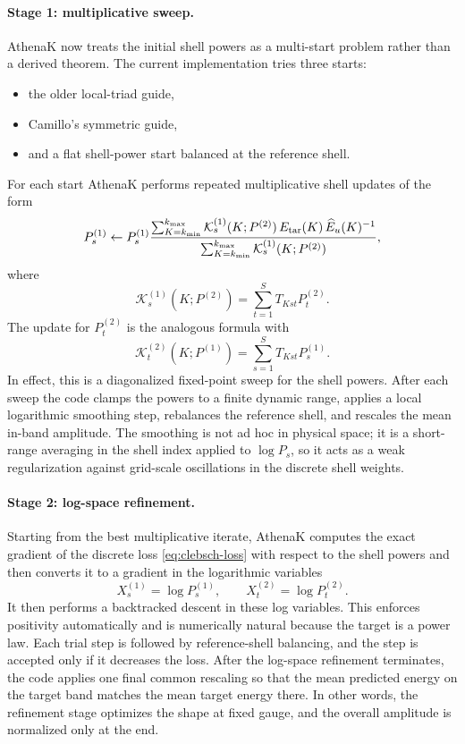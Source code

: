 \documentclass[11pt]{article}
\begin{document}
\paragraph{Stage 1: multiplicative sweep.}
AthenaK now treats the initial shell powers as a multi-start problem rather than a derived theorem. The current implementation tries three starts:
\begin{itemize}
\item the older local-triad guide,
\item Camillo's symmetric guide,
\item and a flat shell-power start balanced at the reference shell.
\end{itemize}
For each start AthenaK performs repeated multiplicative shell updates of the form
\begin{equation}
P_s^{(1)}
\leftarrow
P_s^{(1)}
\frac{\sum_{K=k_{\min}}^{k_{\max}}
\mathcal{K}^{(1)}_s(K;P^{(2)})\,E_{\rm tar}(K)\,\widehat{E}_u(K)^{-1}}
{\sum_{K=k_{\min}}^{k_{\max}}
\mathcal{K}^{(1)}_s(K;P^{(2)})},
\end{equation}
where
\begin{equation}
\mathcal{K}^{(1)}_s(K;P^{(2)})
=
\sum_{t=1}^{S} T_{Kst}P_t^{(2)}.
\end{equation}
The update for $P_t^{(2)}$ is the analogous formula with
\begin{equation}
\mathcal{K}^{(2)}_t(K;P^{(1)})
=
\sum_{s=1}^{S} T_{Kst}P_s^{(1)}.
\end{equation}
In effect, this is a diagonalized fixed-point sweep for the shell powers. After each sweep the code clamps the powers to a finite dynamic range, applies a local logarithmic smoothing step, rebalances the reference shell, and rescales the mean in-band amplitude. The smoothing is not ad hoc in physical space; it is a short-range averaging in the shell index applied to $\log P_s$, so it acts as a weak regularization against grid-scale oscillations in the discrete shell weights.

\paragraph{Stage 2: log-space refinement.}
Starting from the best multiplicative iterate, AthenaK computes the exact gradient of the discrete loss \eqref{eq:clebsch-loss} with respect to the shell powers and then converts it to a gradient in the logarithmic variables
\begin{equation}
X_s^{(1)} = \log P_s^{(1)},
\qquad
X_t^{(2)} = \log P_t^{(2)}.
\end{equation}
It then performs a backtracked descent in these log variables. This enforces positivity automatically and is numerically natural because the target is a power law. Each trial step is followed by reference-shell balancing, and the step is accepted only if it decreases the loss. After the log-space refinement terminates, the code applies one final common rescaling so that the mean predicted energy on the target band matches the mean target energy there. In other words, the refinement stage optimizes the shape at fixed gauge, and the overall amplitude is normalized only at the end.
\end{document}
